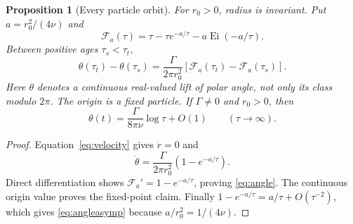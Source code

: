 \documentclass[10pt]{article}
\newtheorem{proposition}{Proposition}
\newcommand{\Ei}{\operatorname{Ei}}
\begin{document}
\begin{proposition}[Every particle orbit]\label{prop:particle}
For $r_0>0$, radius is invariant.  Put $a=r_0^2/(4\nu)$ and
\begin{equation}\label{eq:primitive}
 \mathcal F_a(\tau)=\tau-\tau e^{-a/\tau}-a\Ei(-a/\tau).
\end{equation}
Between positive ages $\tau_s<\tau_t$,
\begin{equation}\label{eq:angle}
 \theta(\tau_t)-\theta(\tau_s)
 =\frac{\Gamma}{2\pi r_0^2}
 [\mathcal F_a(\tau_t)-\mathcal F_a(\tau_s)].
\end{equation}
Here $\theta$ denotes a continuous real-valued lift of polar angle, not only
its class modulo $2\pi$.
The origin is a fixed particle.  If $\Gamma\ne0$ and $r_0>0$, then
\begin{equation}\label{eq:angleasymp}
 \theta(t)=\frac{\Gamma}{8\pi\nu}\log\tau+O(1)
 \qquad(\tau\to\infty).
\end{equation}
\end{proposition}
\begin{proof}
Equation~\eqref{eq:velocity} gives $\dot r=0$ and
\[
 \dot\theta=\frac{\Gamma}{2\pi r_0^2}(1-e^{-a/\tau}).
\]
Direct differentiation shows $\mathcal F_a'=1-e^{-a/\tau}$, proving
\eqref{eq:angle}.  The continuous origin value proves the fixed-point claim.
Finally $1-e^{-a/\tau}=a/\tau+O(\tau^{-2})$, which gives
\eqref{eq:angleasymp} because $a/r_0^2=1/(4\nu)$.
\end{proof}
\end{document}
